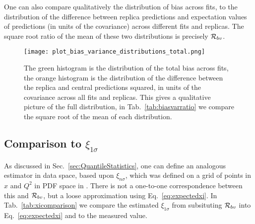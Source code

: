 One can also compare qualitatively the distribution of bias across fits, to the
distribution of the difference between replica predictions and expectation
values of predictions (in units of the covariance) across different fits
and replicas. The square root ratio of the mean of these two distributions
is precisely $\mathcal{R}_{bv}$.

\begin{figure}
    \centering
    \texttt{[image: plot\_bias\_variance\_distributions\_total.png]}
    \caption{The green histogram is the distribution of the total bias across fits,
    the orange histogram is the distribution of the difference between the
    replica and central predictions squared, in units of the covariance
    across all fits and replicas. This gives a qualitative picture of the full
    distribution, in Tab.~\ref{tab:biasvarratio} we compare the square root of the
    mean of each distribution.}
\end{figure}

\subsection{Comparison to $\xi_{1\sigma}$}

As discussed in Sec.~\ref{sec:QuantileStatistics}, one can define an analogous
estimator in data space, based upon $\xi_{n\sigma}$, which was defined on a grid
of points in $x$ and $Q^2$ in PDF space in \cite{nnpdf30}. There is not
a one-to-one correspondence
between this and $\mathcal{R}_{bv}$, but a loose approximation using
Eq.~\ref{eq:expectedxi}. In Tab.~\ref{tab:xicomparison} we compare the estimated
$\xi_{1\sigma}$ from
subsituting $\mathcal{R}_{bv}$ into Eq.~\ref{eq:expectedxi} and to the
measured value.

